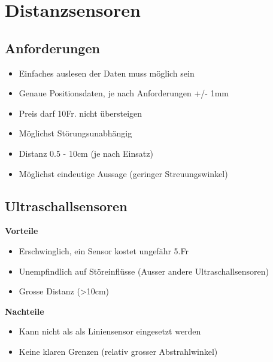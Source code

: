 \section{Distanzsensoren}
\subsection{Anforderungen}
\begin{itemize}
\item Einfaches auslesen der Daten muss möglich sein
\item Genaue Positionsdaten, je nach Anforderungen +/- 1mm
\item Preis darf 10Fr. nicht übersteigen
\item Möglichst Störungsunabhängig
\item Distanz 0.5 - 10cm (je nach Einsatz)
\item Möglichst eindeutige Aussage (geringer Streuungswinkel)
\end{itemize}

\subsection{Ultraschallsensoren}
\textbf {Vorteile}
\begin{itemize}
\item Erschwinglich, ein Sensor kostet ungefähr 5.Fr
\item Unempfindlich auf Störeinflüsse (Ausser andere Ultraschallsensoren)
\item Grosse Distanz (>10cm)\\
\end{itemize}
\textbf {Nachteile}
\begin{itemize}
\item Kann nicht als als Liniensensor eingesetzt werden
\item Keine klaren Grenzen (relativ grosser Abstrahlwinkel)
\end{itemize}

